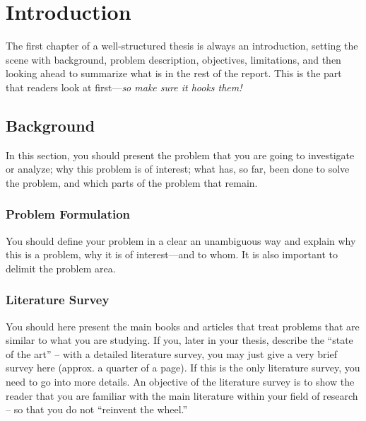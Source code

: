 \chapter{Introduction}
The first chapter of a well-structured thesis is always an introduction, setting the scene with background, problem description, objectives, limitations, and then looking ahead to summarize what is in the rest of the report. This is the part that readers look at first---\emph{so make sure it hooks them!}

\section{Background}
In this section, you should present the problem that you are going to investigate or analyze; why this problem is of interest; what has, so far, been done to solve the problem, and which parts of the problem that remain.
\subsection*{Problem Formulation}
You should define your problem in a clear an unambiguous way and explain why this is a problem, why it is of interest---and to whom. It is also important to delimit the problem area.
\subsection*{Literature Survey}
You should here present the main books and articles that treat problems that are similar to what  you are studying. If you,  later in your thesis, describe the ``state of the art'' -- with a detailed literature survey, you may just give a very brief survey here (approx. a quarter of a page). If this is the only literature survey, you need to go into more details. An objective of the literature survey is to show the reader that you are familiar with the main literature within your field of research -- so that you do not ``reinvent the wheel.''



